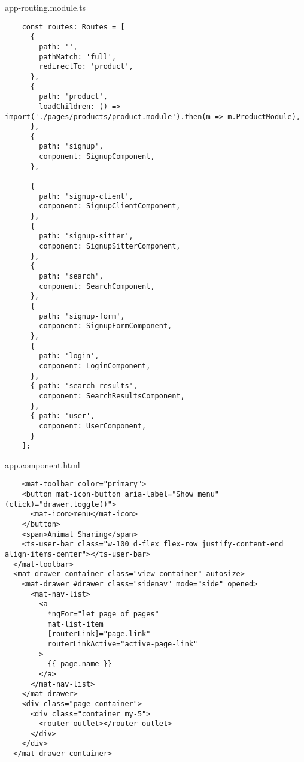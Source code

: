 
app-routing.module.ts
\begin{lstlisting}
    const routes: Routes = [
      {
        path: '',
        pathMatch: 'full',
        redirectTo: 'product',
      },
      {
        path: 'product',
        loadChildren: () => import('./pages/products/product.module').then(m => m.ProductModule),
      },
      {
        path: 'signup',
        component: SignupComponent,
      },
    
      {
        path: 'signup-client',
        component: SignupClientComponent,
      },
      {
        path: 'signup-sitter',
        component: SignupSitterComponent,
      },
      {
        path: 'search',
        component: SearchComponent,
      },
      {
        path: 'signup-form',
        component: SignupFormComponent,
      },
      {
        path: 'login',
        component: LoginComponent,
      },
      { path: 'search-results',
        component: SearchResultsComponent,
      },
      { path: 'user',
        component: UserComponent,
      }
    ];
\end{lstlisting}

app.component.html
\begin{lstlisting}
    <mat-toolbar color="primary">
    <button mat-icon-button aria-label="Show menu" (click)="drawer.toggle()">
      <mat-icon>menu</mat-icon>
    </button>
    <span>Animal Sharing</span>
    <ts-user-bar class="w-100 d-flex flex-row justify-content-end align-items-center"></ts-user-bar>
  </mat-toolbar>
  <mat-drawer-container class="view-container" autosize>
    <mat-drawer #drawer class="sidenav" mode="side" opened>
      <mat-nav-list>
        <a
          *ngFor="let page of pages"
          mat-list-item
          [routerLink]="page.link"
          routerLinkActive="active-page-link"
        >
          {{ page.name }}
        </a>
      </mat-nav-list>
    </mat-drawer>
    <div class="page-container">
      <div class="container my-5">
        <router-outlet></router-outlet>
      </div>
    </div>
  </mat-drawer-container>
\end{lstlisting}

